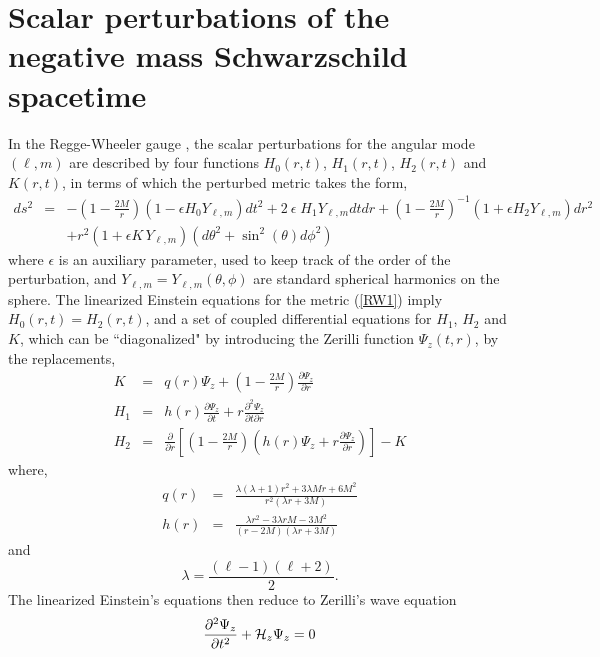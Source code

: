 \documentclass[aps,floats,showpacs,amssymb,tightenlines]{revtex4}
\def\e{\epsilon}
\begin{document}
\section{Scalar perturbations of the negative mass Schwarzschild spacetime}\label{rw}
  In the Regge-Wheeler gauge \cite{rw}, the scalar
perturbations for the angular mode $(\ell,m)$  are
described by  four functions $H_0(r,t)$, $H_1(r,t)$, $H_2(r,t)$ and
$K(r,t)$, in terms of which the perturbed metric takes the form,
\begin{eqnarray}
\label{RW1}
ds^2 & = & -\left(1-\frac{2M}{r}\right)\left(1- \e H_0 Y_{\ell,m}\right)dt^2 +
2 \: \e \;  H_1 Y_{\ell,m} dt dr+\left(1-\frac{2M}{r}\right)^{-1}\left(1+ \e H_2 Y_{\ell,m}\right)dr^2
\nonumber \\
& & +r^2\left(1+ \e K\, Y_{\ell,m}\right) \left( d \theta^2 +  \sin^2(\theta)
d \phi^2 \right)
\end{eqnarray}
where $\epsilon$ is an auxiliary parameter, used to  keep track of the order of the perturbation, and
$Y_{\ell,m}=  Y_{\ell,m}(\theta,\phi)$ are standard spherical
harmonics on the sphere. The linearized Einstein equations for the
metric (\ref{RW1}) imply $H_0(r,t)=H_2(r,t)$, and a set of coupled
differential equations for $H_1$, $H_2$ and $K$, which can be  ``diagonalized" by introducing
the Zerilli function $\Psi_z(t,r)$, by the replacements,
\begin{eqnarray}
\label{RW2}
K & = & q(r) \Psi_z+\left(1-\frac{2M}{r}\right)\frac{\partial \Psi_z}{\partial r} \nonumber \\
H_1 & = & h(r)\frac{\partial \Psi_z}{\partial t}+r\frac{\partial^2 \Psi_z}{\partial t \partial r}
 \\
H_2 & = & \frac{\partial }{\partial r}\left[\left(1-\frac{2M}{r}\right)\left(h(r) \Psi_z
+r\frac{\partial \Psi_z}{ \partial r} \right)\right] -K  \nonumber
\end{eqnarray}
where,
\begin{eqnarray}
\label{RW2a}
q(r) & = &  \frac{\lambda(\lambda+1)r^2+3 \lambda M r + 6 M^2}{r^2(\lambda r + 3 M)}\nonumber \\
h(r) & = &  \frac{\lambda r^2 - 3 \lambda r M -3 M^2}{(r-2M)(\lambda r + 3M)}\nonumber
\end{eqnarray}
and
\begin{equation}
\lambda =  \frac{(\ell-1)(\ell+2)}{2} .
\end{equation}
The linearized Einstein's equations then reduce to Zerilli's wave equation
\begin{equation}
\label{zerilli}
\frac{\partial^2 \Psi_z}{\partial t^2}+{\cal H}_z \Psi_z = 0
\end{equation}
\end{document}
